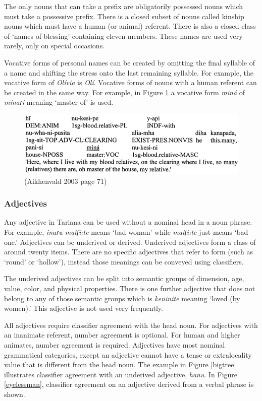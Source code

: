 \documentclass{article}
\begin{document}
The only nouns that can take a prefix are obligatorily possessed nouns which must take a possessive prefix. There is a closed subset of nouns called kinship nouns which must have a human (or animal) referent. There is also a closed class of `names of blessing' containing eleven members. These names are used very rarely, only on special occasions.

Vocative forms of personal names can be created by omitting the final syllable of a name and shifting the stress onto the last remaining syllable. For example, the vocative form of \textit{Olívia} is \textit{Olí}. Vocative forms of nouns with a human referent can be created in the same way. For example, in Figure \ref*{masterof} a vocative form \textit{miná} of \textit{mínaɾi} meaning `master of' is used.

\begin{figure}[h!]
\centering
\includegraphics[scale = 0.38]{masterof.png}
	\caption{(Aikhenvald 2003 page 71)}
	\label{masterof}
\end{figure}

\subsubsection{Adjectives}
Any adjective in Tariana can be used without a nominal head in a noun phrase. For example, \textit{inaɾu matʃi:te} means `bad woman' while \textit{matʃi:te} just means `bad one.' Adjectives can be underived or derived. Underived adjectives form a class of around twenty items. There are no specific adjectives that refer to form (such as `round' or `hollow'), instead those meanings can be conveyed using classifiers.

The underived adjectives can be split into semantic groups of dimension, age, value, color, and physical properties. There is one further adjective that does not belong to any of those semantic groups which is \textit{keninite} meaning `loved (by women).' This adjective is not used very frequently.

All adjectives require classifier agreement with the head noun. For adjectives with an inanimate referent, number agreement is optional. For human and higher animates, number agreement is required. Adjectives have most nominal grammatical categories, except an adjective cannot have a tense or extralocality value that is different from the head noun. The example in Figure \ref*{bigtree} illustrates classifier agreement with an underived adjective, \textit{hanu}. In Figure \ref*{eyelessman}, classifier agreement on an adjective derived from a verbal phrase is shown.
\end{document}
